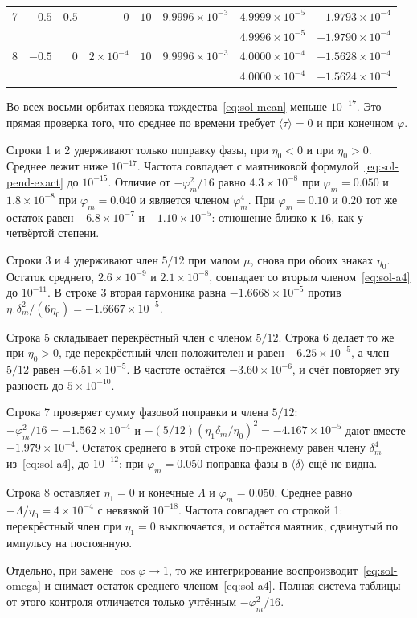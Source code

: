 \begin{table}[htb]
\begin{ruledtabular}
\begin{tabular}{rrrrrrrr}
7 & $-0.5$ & $0.5$ & $0$ & $10$ & $9.9996\times 10^{-3}$
& $4.9999\times 10^{-5}$ & $-1.9793\times 10^{-4}$ \\
 & & & & &
& $4.9996\times 10^{-5}$ & $-1.9790\times 10^{-4}$ \\
8 & $-0.5$ & $0$ & $2\times 10^{-4}$ & $10$ & $9.9996\times 10^{-3}$
& $4.0000\times 10^{-4}$ & $-1.5628\times 10^{-4}$ \\
 & & & & &
& $4.0000\times 10^{-4}$ & $-1.5624\times 10^{-4}$ \\
\end{tabular}
\end{ruledtabular}
\end{table}

Во всех восьми орбитах невязка тождества~\eqref{eq:sol-mean} меньше $10^{-17}$. Это прямая проверка того, что среднее по времени требует $\langle\tau\rangle=0$ и при конечном $\varphi$.

Строки 1 и 2 удерживают только поправку фазы, при $\eta_0<0$ и при $\eta_0>0$. Среднее лежит ниже $10^{-17}$. Частота совпадает с маятниковой формулой~\eqref{eq:sol-pend-exact} до $10^{-15}$. Отличие от $-\varphi_m^2/16$ равно $4.3\times 10^{-8}$ при $\varphi_m=0.050$ и $1.8\times 10^{-8}$ при $\varphi_m=0.040$ и является членом $\varphi_m^4$. При $\varphi_m=0.10$ и $0.20$ тот же остаток равен $-6.8\times 10^{-7}$ и $-1.10\times 10^{-5}$: отношение близко к $16$, как у четвёртой степени.

Строки 3 и 4 удерживают член $5/12$ при малом $\mu$, снова при обоих знаках $\eta_0$. Остаток среднего, $2.6\times 10^{-9}$ и $2.1\times 10^{-8}$, совпадает со вторым членом~\eqref{eq:sol-a4} до $10^{-11}$. В строке 3 вторая гармоника равна $-1.6668\times 10^{-5}$ против $\eta_1\delta_m^2/(6\eta_0)=-1.6667\times 10^{-5}$.

Строка 5 складывает перекрёстный член с членом $5/12$. Строка 6 делает то же при $\eta_0>0$, где перекрёстный член положителен и равен $+6.25\times 10^{-5}$, а член $5/12$ равен $-6.51\times 10^{-5}$. В частоте остаётся $-3.60\times 10^{-6}$, и счёт повторяет эту разность до $5\times 10^{-10}$.

Строка 7 проверяет сумму фазовой поправки и члена $5/12$: $-\varphi_m^2/16=-1.562\times 10^{-4}$ и $-(5/12)(\eta_1\delta_m/\eta_0)^2=-4.167\times 10^{-5}$ дают вместе $-1.979\times 10^{-4}$. Остаток среднего в этой строке по-прежнему равен члену $\delta_m^4$ из~\eqref{eq:sol-a4}, до $10^{-12}$: при $\varphi_m=0.050$ поправка фазы в $\langle\delta\rangle$ ещё не видна.

Строка 8 оставляет $\eta_1=0$ и конечные $\Lambda$ и $\varphi_m=0.050$. Среднее равно $-\Lambda/\eta_0=4\times 10^{-4}$ с невязкой $10^{-18}$. Частота совпадает со строкой 1: перекрёстный член при $\eta_1=0$ выключается, и остаётся маятник, сдвинутый по импульсу на постоянную.

Отдельно, при замене $\cos\varphi\to 1$, то же интегрирование воспроизводит~\eqref{eq:sol-omega} и снимает остаток среднего членом~\eqref{eq:sol-a4}. Полная система таблицы от этого контроля отличается только учтённым $-\varphi_m^2/16$.
